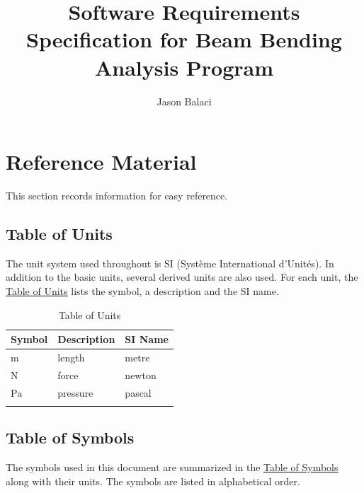 \documentclass[12pt]{article}
\title{Software Requirements Specification for Beam Bending Analysis Program}
\author{Jason Balaci}
\begin{document}
\maketitle
\tableofcontents
\newpage
\section{Reference Material}
\label{Sec:RefMat}
This section records information for easy reference.

\subsection{Table of Units}
\label{Sec:ToU}
The unit system used throughout is SI (Système International d'Unités). In addition to the basic units, several derived units are also used. For each unit, the \hyperref[Table:ToU]{Table of Units} lists the symbol, a description and the SI name.

\begin{longtable}{l l l}
\toprule
\textbf{Symbol} & \textbf{Description} & \textbf{SI Name}
\\
\midrule
\endhead
${\text{m}}$ & length & metre
\\
${\text{N}}$ & force & newton
\\
${\text{Pa}}$ & pressure & pascal
\\
\bottomrule
\caption{Table of Units}
\label{Table:ToU}
\end{longtable}
\subsection{Table of Symbols}
\label{Sec:ToS}
The symbols used in this document are summarized in the \hyperref[Table:ToS]{Table of Symbols} along with their units. The symbols are listed in alphabetical order.
\end{document}
